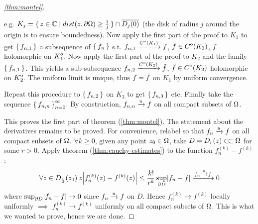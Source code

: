 \begin{proof}[\ref{thm:montel}]
\begin{center}
\end{center}
e.g. $K_j = \set{ z \in \mathbb{C}\mid dist(z,\partial \Omega) \geq \frac{1}{j} } \cap \overline{D_j(0)}$ (the disk of radius $j$ around the origin is to ensure boundedness). Now apply the first part of the proof to $K_1$ to get $\set{ f_{n,1} } $ a subsequence of $\set{f_n}$ s.t. $ f_{n,1}  \xrightarrow[]{{\kern0ptC}^{\mathrm{o}}(K_1)} f$, $f \in {\kern0ptC}^{\mathrm{o}} (K_1)$, $f$ holomorphic on ${\kern0ptK}^{\mathrm{o}}_{1}$. Now apply the first part of the proof to $K_2$ and the family $\set{ f_{n,1} }$. This yields a sub-subsequence $f_{n,2} \xrightarrow[]{{\kern0ptC}^{\mathrm{o}}(K_2)} \Tilde{f}$, $\Tilde{f} \in {\kern0ptC}^{\mathrm{o}}(K_2)$ holomorphic on ${\kern0ptK}^{\mathrm{o}}_{2}$. The uniform limit is unique, thus $f = \Tilde{f}$ on $K_1$ by uniform convergence.

Repeat this procedure to $\set{ f_{n,2} }$ on $K_3$ to get $\set{ f_{n,3} }$ etc. Finally take the sequence $\set{ f_{n,n} }_{n=0}^\infty$. By construction, $f_{n,n} \xrightarrow[]{u} f$ on all compact subsets of $\Omega$.


This proves the first part of theorem (\ref{thm:montel}). The statement about the derivatives remains to be proved. For convenience, relabel so that $f_n \xrightarrow[]{u} f$ on all compact subsets of $\Omega$. $\forall k \geq 0$, given any point $z_0 \in \Omega$, take $D = D_r(z) \ssubset \om$ for some $ r> 0$. Apply theorem (\ref{thm:cauchy-estimates}) to the function $f_n^{(k)} - f^{(k)}$:
\begin{align*}
    \forall z \in D_{\frac{r}{2}} (z_0) 
    \: z\abs{f_n^{(k)}(z) - f^{(k)} (z) } \leq \frac{k!}{r^k} \sup_{\partial D} \abs{f_n - f} \xrightarrow[]{f_n \xrightarrow[]{u} f} 0
\end{align*}
where $\sup_{\partial D} \abs{f_n - f} \to 0$ since $f_n \xrightarrow[]{u} f$ on $\overline{D}$. Hence $f_n^{(k)} \to f^{(k)}$ locally uniformly $\implies$ $f_n^{(k)} \to f^{(k)}$ uniformly on all compact subsets of $\Omega$. This is what we wanted to prove, hence we are done.

\end{proof}

